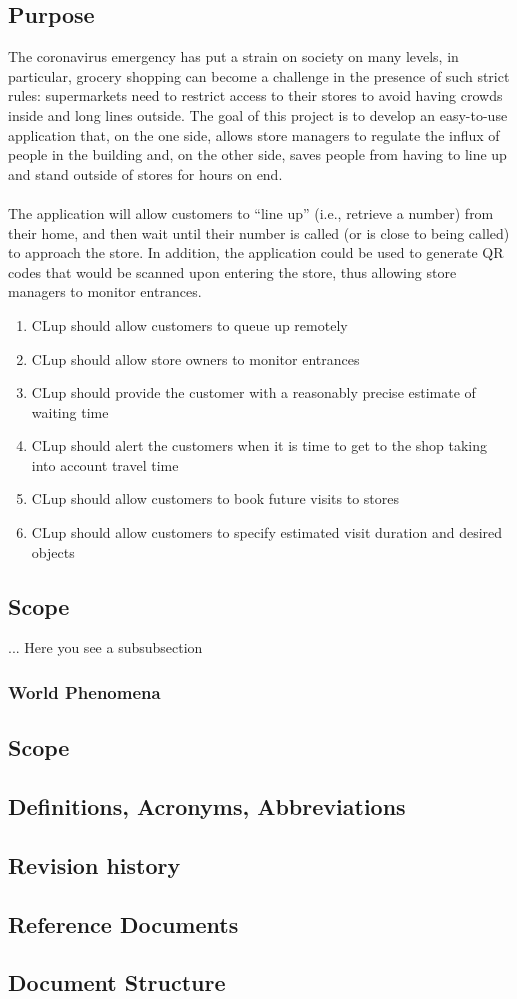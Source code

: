 \subsection{Purpose}
The coronavirus emergency has put a strain on society on many levels, in  particular,  grocery  shopping can  become  a  challenge  in  the presence  of  such  strict  rules: supermarkets  need to  restrict  access  to  their  stores  to  avoid having  crowds  inside and long  lines outside. The  goal  of  this  project  is  to  develop  an  easy-to-use  application  that,  on  the  one  side,  allows  store managers  to  regulate  the  influx  of  people  in  the  building  and,  on  the  other  side,  saves  people  from having to line up and stand outside of stores for hours on end. \\\\
The application will allow customers to “line up” (i.e., retrieve a number) from their home, and then wait  until  their  number  is  called  (or  is  close  to  being  called)  to  approach  the  store.  In  addition,  the application could be used to generate QR codes that would be scanned upon entering the store, thus allowing store managers to monitor entrances.

\begin{enumerate}
	\item CLup should allow customers to queue up remotely
	\item CLup should allow store owners to monitor entrances
	\item CLup should provide the customer with a reasonably precise estimate of waiting time
	\item CLup should alert the customers when it is time to get to the shop taking into account travel time
	\item CLup should allow customers to book future visits to stores
	\item CLup should allow customers to specify estimated visit duration and desired objects
\end{enumerate}

\subsection{Scope}
... Here you see a subsubsection
\subsubsection{World Phenomena}
\subsection{Scope}
\subsection{Definitions, Acronyms, Abbreviations}
\subsection{Revision history}
\subsection{Reference Documents}
\subsection{Document Structure}